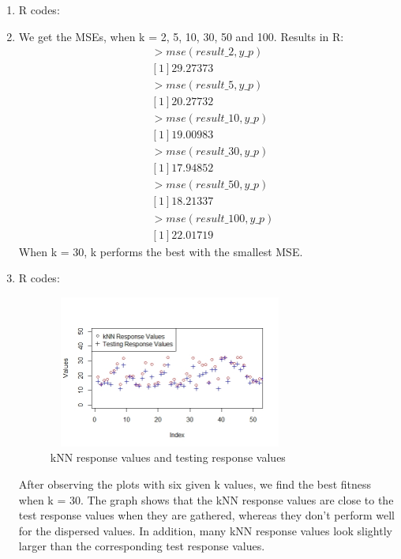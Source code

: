 \documentclass[10pt]{article}
\begin{document}
\begin{enumerate}[1)]
\vspace{3mm}

\item
R codes:
\vspace{3mm}

\item
We get the MSEs, when k = 2, 5, 10, 30, 50 and 100. Results in R:
\begin{align*}
&> mse(result\_2, y\_p)\\
&[1] 29.27373\\
&> mse(result\_5, y\_p)\\
&[1] 20.27732\\
&> mse(result\_10, y\_p)\\
&[1] 19.00983\\
&> mse(result\_30, y\_p)\\
&[1] 17.94852\\
&> mse(result\_50, y\_p)\\
&[1] 18.21337\\
&> mse(result\_100, y\_p)\\
&[1] 22.01719
\end{align*}
When k = 30, k performs the best with the smallest MSE.
\vspace{3mm}

\item
R codes:

\begin{figure}[H]
  \centering
  \includegraphics[width=8cm,height=5cm]{p33a.jpeg}
  \caption{kNN response values and testing response values} %
\end{figure}
After observing the plots with six given k values, we find the best fitness when k = 30. The graph shows that the kNN response values are close to the test response values when they are gathered, whereas they don't perform well for the dispersed values. In addition, many kNN response values look slightly larger than the corresponding test response values.
\vspace{3mm}


\end{enumerate}
\end{document}
